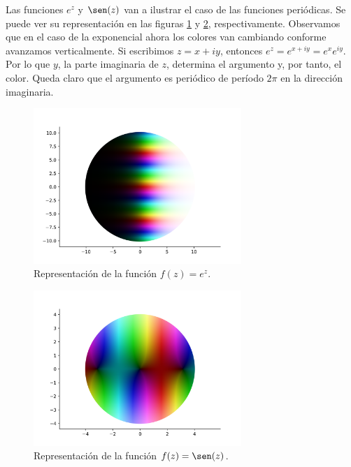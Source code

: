 Las funciones $e^z$ y $\sen(z)$ van a ilustrar el caso de las funciones periódicas. Se puede ver su representación en las figuras \ref{fig:e^z} y \ref{fig:sen(z)}, respectivamente. Observamos que en el caso de la exponencial ahora los colores van cambiando conforme avanzamos verticalmente. Si escribimos $z = x + iy$, entonces $e^z = e^{x+i y} = e^x e^{i y}$. Por lo que $y$, la parte imaginaria de $z$, determina el argumento y, por tanto, el color. Queda claro que el argumento es periódico de período $2 \pi$ en la dirección imaginaria. \\

\begin{figure}[!htbp]
    \centering
    \includegraphics[width=0.7\textwidth]{../Aplicacion/e^z.png}
    \caption{Representación de la función $f(z) = e^z$.}
    \label{fig:e^z}
\end{figure}

\begin{figure}[!htbp]
    \centering
    \includegraphics[width=0.7\textwidth]{../Aplicacion/sen(z).png}
    \caption{Representación de la función $f(z) = \sen(z)$.}
    \label{fig:sen(z)}
\end{figure}

